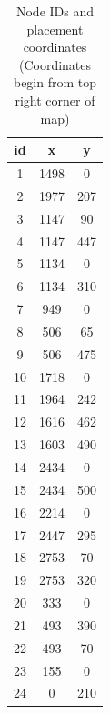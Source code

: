 \documentclass[
  print, %
  Table,   %
  nolof,     %
  nolot,     %
           oneside
]{fithesis3}
\begin{document}
\begin{table}[h!!!]
  \begin{tabularx}{120px}{c|cc}

id &    x &    y\\
 \hline
1 &    1498 &    0\\
2 &    1977 &    207\\
3 &    1147 &    90\\
4 &    1147 &    447\\
5 &    1134 &    0\\
6 &    1134 &    310\\
7 &    949 &    0\\
8 &    506 &    65\\
9 &    506 &    475\\
10 &    1718 &    0\\
11 &    1964 &    242\\
12 &    1616 &    462\\
13 &    1603 &    490\\
14 &    2434 &    0\\
15 &    2434 &    500\\
16 &    2214 &    0\\
17 &    2447 &    295\\
18 &    2753 &    70\\
19 &    2753 &    320\\
20 &    333 &    0\\
21 &    493 &    390\\
22 &    493 &    70\\
23 &    155 &    0\\
24 &    0 &    210\\


\end{tabularx}
\caption[Node IDs and placement coordinates]{Node IDs and placement coordinates \\(Coordinates begin from top right corner of map)}

\label{tab:map}
\end{table}

\clearpage
\end{document}
